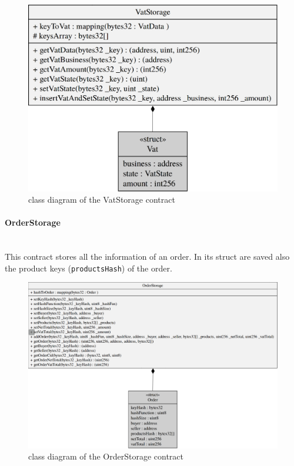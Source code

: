 \begin{figure}[H]
	\centering
	\includegraphics[scale=0.30]{res/images/solidity/vatstorage.png}
	\caption{class diagram of the VatStorage contract}
\end{figure}
\pagebreak

\paragraph{OrderStorage}\mbox{}\\

\noindent This contract stores all the information of an order. In its struct are saved also the product keys (\texttt{productsHash}) of the order.
\begin{figure}[H]
	\centering
	\includegraphics[scale=0.35]{res/images/solidity/orderstorage.png}
	\caption{class diagram of the OrderStorage contract}
\end{figure}